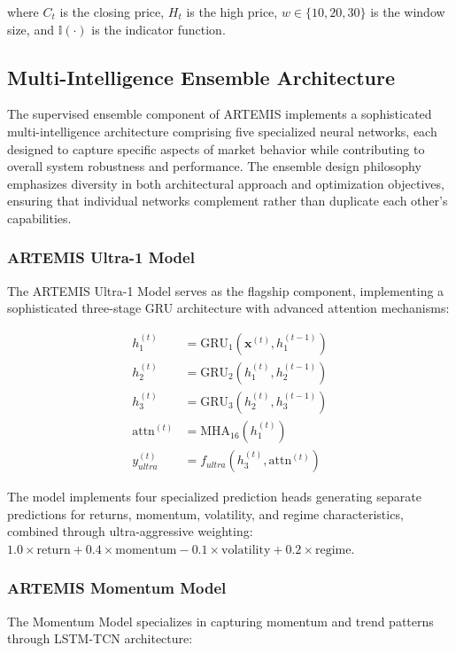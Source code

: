\documentclass[10pt,twocolumn]{article}
\begin{document}
where $C_t$ is the closing price, $H_t$ is the high price, $w \in \{10,20,30\}$ is the window size, and $\mathbb{I}(\cdot)$ is the indicator function.

\subsection{Multi-Intelligence Ensemble Architecture}

The supervised ensemble component of ARTEMIS implements a sophisticated multi-intelligence architecture comprising five specialized neural networks, each designed to capture specific aspects of market behavior while contributing to overall system robustness and performance. The ensemble design philosophy emphasizes diversity in both architectural approach and optimization objectives, ensuring that individual networks complement rather than duplicate each other's capabilities.

\subsubsection{ARTEMIS Ultra-1 Model}

The ARTEMIS Ultra-1 Model serves as the flagship component, implementing a sophisticated three-stage GRU architecture with advanced attention mechanisms:

\begin{align}
h_1^{(t)} &= \text{GRU}_1(\mathbf{x}^{(t)}, h_1^{(t-1)}) \\
h_2^{(t)} &= \text{GRU}_2(h_1^{(t)}, h_2^{(t-1)}) \\
h_3^{(t)} &= \text{GRU}_3(h_2^{(t)}, h_3^{(t-1)}) \\
\text{attn}^{(t)} &= \text{MHA}_{16}(h_1^{(t)}) \\
y_{ultra}^{(t)} &= f_{ultra}(h_3^{(t)}, \text{attn}^{(t)})
\end{align}

The model implements four specialized prediction heads generating separate predictions for returns, momentum, volatility, and regime characteristics, combined through ultra-aggressive weighting: $1.0 \times \text{return} + 0.4 \times \text{momentum} - 0.1 \times \text{volatility} + 0.2 \times \text{regime}$.

\subsubsection{ARTEMIS Momentum Model}

The Momentum Model specializes in capturing momentum and trend patterns through LSTM-TCN architecture:
\end{document}

